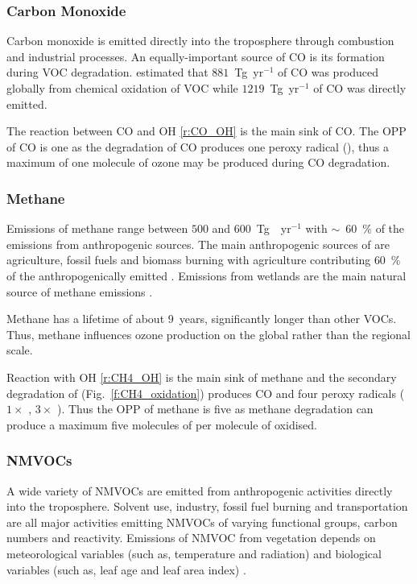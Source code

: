 \subsubsection{Carbon Monoxide}
Carbon monoxide is emitted directly into the troposphere through combustion and industrial processes.
An equally-important source of CO is its formation during VOC degradation.
\citet{Hauglustaine:1998} estimated that $881$~Tg~yr$^{-1}$ of CO was produced globally from chemical oxidation of VOC while $1219$~Tg~yr$^{-1}$ of CO was directly emitted.

The reaction between CO and OH \eqref{r:CO_OH} is the main sink of CO.
The OPP of CO is one as the degradation of CO produces one peroxy radical (), thus a maximum of one molecule of ozone may be produced during CO degradation.

\subsubsection{Methane}
Emissions of methane range between $500$ and $600$~Tg~~yr$^{-1}$ with $\sim$~$60$~\% of the emissions from anthropogenic sources.
The main anthropogenic sources of  are agriculture, fossil fuels and biomass burning with agriculture contributing $60$~\% of the anthropogenically emitted .
Emissions from wetlands are the main natural source of methane emissions \citep{Kirschke:2013}.

Methane has a lifetime of about $9$~years, significantly longer than other VOCs.
Thus, methane influences ozone production on the global rather than the regional scale.  

Reaction with OH \eqref{r:CH4_OH} is the main sink of methane and the secondary degradation of  (Fig.~\ref{f:CH4_oxidation}) produces CO and four peroxy radicals ($1 \times$ , $3 \times$ ).
Thus the OPP of methane is five as methane degradation can produce a maximum five molecules of  per molecule of  oxidised. 

\subsubsection{NMVOCs}
A wide variety of NMVOCs are emitted from anthropogenic activities directly into the troposphere.
Solvent use, industry, fossil fuel burning and transportation are all major activities emitting NMVOCs of varying functional groups, carbon numbers and reactivity.
Emissions of NMVOC from vegetation depends on meteorological variables (such as, temperature and radiation) and biological variables (such as, leaf age and leaf area index) \citep{Guenther:2012}.

